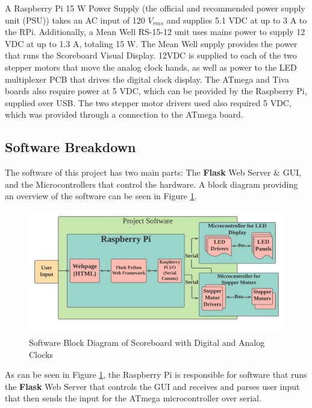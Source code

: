 \documentclass[11pt]{article}
\begin{document}
A Raspberry Pi 15 W Power Supply (the official and recommended power supply unit (PSU)) takes an AC input of 120 $V_{rms}$ and supplies 5.1 VDC at up to 3 A to the RPi.
Additionally, a Mean Well RS-15-12 unit uses mains power to  supply 12 VDC at up to 1.3 A, totaling 15 W.
The Mean Well supply provides the power that runs the Scoreboard Visual Display. 
12VDC is supplied to each of the two stepper motors that move the analog clock hands, as well as power to the LED multiplexer PCB that drives the digital clock display.
The ATmega and Tiva boards also require power at 5 VDC, which can be provided by the Raspberry Pi, supplied over USB.
The two stepper motor drivers used also required 5 VDC, which was provided through a connection to the ATmega board. 





\subsection{Software Breakdown}
\label{SoftBreakdown}

The software of this project has two main parts: The \textbf{Flask} Web Server \& GUI, and the Microcontrollers that control the hardware. A block diagram providing an overview of the software can be seen in Figure \ref{SoftBlock}.

\begin{figure}[H]
\centering
\includegraphics[width=6in]{Software_Nema_7.png}
\caption{Software Block Diagram of Scoreboard with Digital and Analog Clocks }
\label{SoftBlock}
\end{figure}

As can be seen in Figure \ref{SoftBlock}, the Raspberry Pi is responsible for software that runs the \textbf{Flask} Web Server that controls the GUI and receives and parses user input that then sends the input for the ATmega microcontroller over serial. 
 
\end{document}
